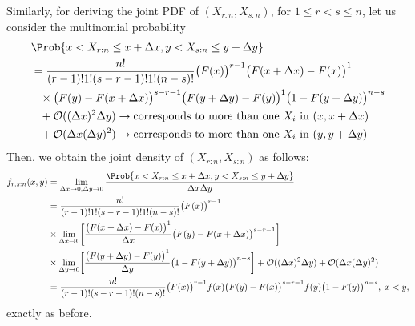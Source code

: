 Similarly, for deriving the joint PDF
of $ (X_{r:n},X_{s:n}) $, for $ 1\le r<s\le n $, let us consider the multinomial
probability
\begin{align*}
     & \Prob{x<X_{r:n}\le x+\Delta x,y< X_{s:n}\le y+\Delta y}                                                            \\
     & =\frac{n!}{(r-1)!1!(s-r-1)!1!(n-s)!}
    \bigl(F(x)\bigr)^{r-1}\bigl(F(x+\Delta x)-F(x)\bigr)^1                                                                \\
     & \phantom{=}\times\bigl(F(y)-F(x+\Delta x)\bigr)^{s-r-1}
    \bigl(F(y+\Delta y)-F(y)\bigr)^1\bigl(1-F(y+\Delta y)\bigr)^{n-s}                                                     \\
     & \phantom{=}+\mathcal{O}((\Delta x)^2 \Delta y)\to\text{corresponds to more than one $ X_i $ in $ (x,x+\Delta x) $} \\
     & \phantom{=}+\mathcal{O}(\Delta x (\Delta y)^2)\to\text{corresponds to more than one $ X_i $ in $ (y,y+\Delta y) $}
\end{align*}
Then, we obtain the joint density of $ (X_{r:n},X_{s:n}) $ as follows:
\begin{align*}
    f_{r,s:n}(x,y)
     & =\lim\limits_{\Delta {x} \to {0},\Delta y\to 0}
    \frac{\Prob{x<X_{r:n}\le x+\Delta x,y< X_{s:n}\le y+\Delta y}}{\Delta x \Delta y}                                                                                                                                 \\
     & =\frac{n!}{(r-1)!1!(s-r-1)!1!(n-s)!}\bigl(F(x)\bigr)^{r-1}                                                                                                                                                     \\
     & \times\lim\limits_{{\Delta x} \to {0}}\biggl[\frac{\bigl(F(x+\Delta x)-F(x)\bigr)^1}{\Delta x}\bigl(F(y)-F(x+\Delta x)\bigr)^{s-r-1}\biggr]                                                                    \\
     & \times \lim\limits_{{\Delta y } \to {0}}\biggl[\frac{\bigl(F(y+\Delta y)-F(y)\bigr)^1}{\Delta y}\bigl(1-F(y+\Delta y)\bigr)^{n-s}\biggr]+\mathcal{O}((\Delta x)^2 \Delta y)+\mathcal{O}(\Delta x (\Delta y)^2) \\
     & =\frac{n!}{(r-1)!(s-r-1)!(n-s)!}\bigl(F(x)\bigr)^{r-1}f(x)\bigl(F(y)-F(x)\bigr)^{s-r-1}f(y)\bigl(1-F(y)\bigr)^{n-s},\; x<y,
\end{align*}
exactly as before.
